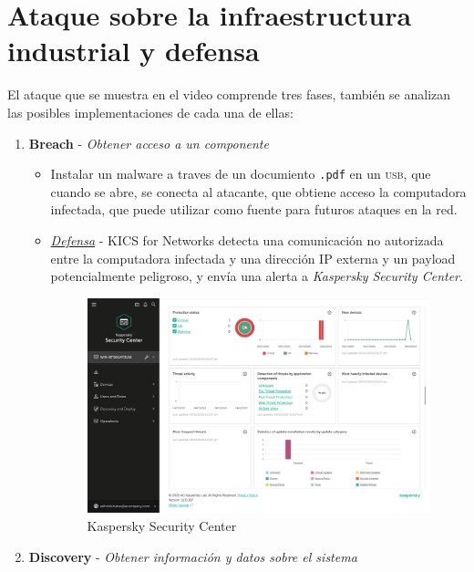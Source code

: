 \section{Ataque sobre la infraestructura industrial y defensa}

El ataque que se muestra en el video comprende tres fases, también se analizan las posibles implementaciones de cada una de ellas:
\begin{enumerate}
   \item \textbf{Breach} - \textit{Obtener acceso a un componente}
   \begin{itemize}
      \item Instalar un malware a traves de un documiento \texttt{.pdf} en un \textsc{usb}, que cuando se abre, se conecta al atacante, que obtiene acceso la computadora infectada, que puede utilizar como fuente para futuros ataques en la red.
      \item \textit{\ul{Defensa}} - \textsc{KICS} for Networks detecta una comunicación no autorizada entre la computadora infectada y una dirección IP externa y un payload potencialmente peligroso, y envía una alerta a \textit{Kaspersky Security Center}.
      \begin{figure}[htbp]
         \centering
         \includegraphics{images/KasperskySC.png}
         \caption{Kaspersky Security Center}
         \label{fig:KasperskySC}
      \end{figure}
   \end{itemize}
   \item \textbf{Discovery} - \textit{Obtener información y datos sobre el sistema}

\end{enumerate}
